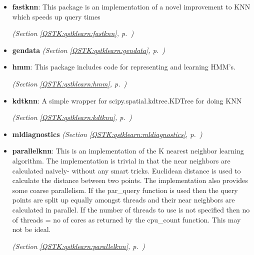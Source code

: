 \begin{itemize}
\setlength{\parskip}{0ex}
\item \textbf{fastknn}: This package is an implementation of a novel improvement to KNN which 
speeds up query times



  \textit{(Section \ref{QSTK:qstklearn:fastknn}, p.~\pageref{QSTK:qstklearn:fastknn})}

\item \textbf{gendata}
  \textit{(Section \ref{QSTK:qstklearn:gendata}, p.~\pageref{QSTK:qstklearn:gendata})}

\item \textbf{hmm}: This package includes code for representing and learning HMM's.



  \textit{(Section \ref{QSTK:qstklearn:hmm}, p.~\pageref{QSTK:qstklearn:hmm})}

\item \textbf{kdtknn}: A simple wrapper for scipy.spatial.kdtree.KDTree for doing KNN



  \textit{(Section \ref{QSTK:qstklearn:kdtknn}, p.~\pageref{QSTK:qstklearn:kdtknn})}

\item \textbf{mldiagnostics}
  \textit{(Section \ref{QSTK:qstklearn:mldiagnostics}, p.~\pageref{QSTK:qstklearn:mldiagnostics})}

\item \textbf{parallelknn}: This is an implementation of the K nearest neighbor learning algorithm. The
implementation is trivial in that the near neighbors are calculated 
naively- without any smart tricks. Euclidean distance is used to calculate 
the distance between two points. The implementation also provides some 
coarse parallelism. If the par\_query function is used then the query 
points are split up equally amongst threads and their near neighbors are 
calculated in parallel. If the number of threads to use is not specified 
then no of threads  = no of cores as returned by the cpu\_count function. 
This may not be ideal.



  \textit{(Section \ref{QSTK:qstklearn:parallelknn}, p.~\pageref{QSTK:qstklearn:parallelknn})}

\end{itemize}




